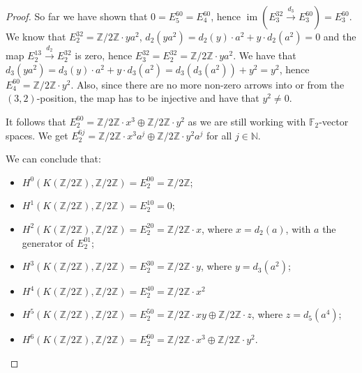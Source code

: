 \documentclass{article}
\newcommand{\numberset}{\mathbb}
\newcommand{\N}{\numberset{N}}
\newcommand{\Z}{\numberset{Z}}
\newcommand{\F}{\numberset{F}}
\DeclareMathOperator{\im}{im}
\begin{document}
\begin{proof}
    So far we have shown that $0=E^{60}_5=E^{60}_4$, hence
    $\im(E^{32}_3\xrightarrow{d_3}E^{60}_3)=E^{60}_3$. We know that
    $E^{32}_2=\Z/2\Z\cdot ya^2$, $d_2(ya^2)=d_2(y)\cdot a^2+y\cdot d_2(a^2)=0$
    and the map $E^{13}_2\xrightarrow{d_2}E^{32}_2$ is zero, hence
    $E^{32}_3=E^{32}_2=\Z/2\Z\cdot ya^2$. We have that $d_3(ya^2)=d_3(y)\cdot
    a^2+y\cdot d_3(a^2)=d_3(d_3(a^2))+y^2=y^2$, hence $E^{60}_4=\Z/2\Z\cdot
    y^2$. Also, since there are no more non-zero arrows into or from the
    $(3,2)$-position, the map has to be injective and have that $y^2\neq 0$.
    
    It follows that $E^{60}_2=\Z/2\Z\cdot x^3\oplus\Z/2\Z\cdot y^2$ as we
    are still working with $\F_2$-vector spaces. We get 
    $E^{6j}_2=\Z/2\Z\cdot x^3a^j\oplus\Z/2\Z\cdot y^2a^j$ for all $j\in\N$.

    We can conclude that:
    \begin{itemize}
        \item $H^0(K(\Z/2\Z),\Z/2\Z)=E^{00}_2=\Z/2\Z$;
        \item $H^1(K(\Z/2\Z),\Z/2\Z)=E^{10}_2=0$;
        \item $H^2(K(\Z/2\Z),\Z/2\Z)=E^{20}_2=\Z/2\Z\cdot x$, where
            $x=d_2(a)$, with $a$ the generator of $E^{01}_2$;
        \item $H^3(K(\Z/2\Z),\Z/2\Z)=E^{30}_2=\Z/2\Z\cdot y$, where
            $y=d_3(a^2)$;
        \item $H^4(K(\Z/2\Z),\Z/2\Z)=E^{40}_2=\Z/2\Z\cdot x^2$
        \item $H^5(K(\Z/2\Z),\Z/2\Z)=E^{50}_2=\Z/2\Z\cdot xy\oplus\Z/2\Z\cdot
            z$, where $z=d_5(a^4)$;
        \item $H^6(K(\Z/2\Z),\Z/2\Z)=E^{60}_2=\Z/2\Z\cdot
            x^3\oplus\Z/2\Z\cdot y^2$.
    \end{itemize}
\end{proof}

\printbibliography
\end{document}
